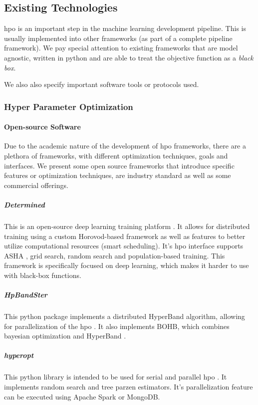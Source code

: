
\subsection{Existing Technologies}

\acrfull{hpo} is an important step in the machine learning development pipeline. This is usually implemented into other frameworks (as part of a complete pipeline framework). We pay special attention to existing frameworks that are model agnostic, written in \acrfull{python} and are able to treat the objective function as a \textit{black box}.

We also also specify important software tools or protocols used.

\subsubsection{Hyper Parameter Optimization}

\paragraph{Open-source Software}

Due to the academic nature of the development of \acrshort{hpo} frameworks, there are a plethora of frameworks, with different optimization techniques, goals and interfaces. We present some open source frameworks that introduce specific features or optimization techniques, are industry standard as well as some commercial offerings.

\subparagraph{Determined} This is an open-source deep learning training platform \parencite{determined-ai}. It allows for distributed training using a custom Horovod-based framework \parencite{alex2018horovod} as well as features to better utilize computational resources (smart scheduling). It's \acrshort{hpo} interface supports ASHA \parencite{li2018massively}, grid search, random search and population-based training. This framework is specifically focused on deep learning, which makes it harder to use with black-box functions.

\subparagraph{HpBandSter} This \acrshort{python} package implements a distributed HyperBand algorithm, allowing for parallelization of the \acrshort{hpo} \parencite{hpbandster}. It also implements BOHB, which combines bayesian optimization and HyperBand \parencite{pmlr-v80-falkner18a}.

\subparagraph{hyperopt} This \acrshort{python} library is intended to be used for serial and parallel \acrshort{hpo} \parencite{hyperopt}. It implements random search and tree parzen estimators. It's parallelization feature can be executed using Apache Spark or MongoDB.

